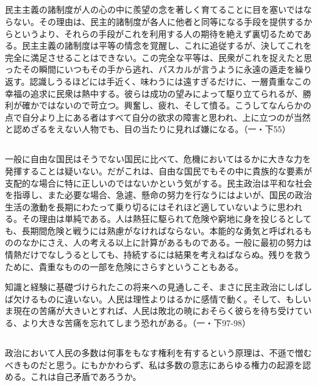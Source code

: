 \subsection{}



民主主義の諸制度が人の心の中に羨望の念を著しく育てることに目を塞いではならない。その理由は、民主的諸制度が各人に他者と同等になる手段を提供するからというより、それらの手段がこれを利用する人の期待を絶えず裏切るためである。民主主義の諸制度は平等の情念を覚醒し、これに追従するが、決してこれを完全に満足させることはできない。この完全な平等は、民衆がこれを捉えたと思ったその瞬間にいつもその手から逃れ、パスカルが言うように永遠の遁走を繰り返す。認識しうるほどには手近く、味わうには遠すぎるだけに、一層貴重なこの幸福の追求に民衆は熱中する。彼らは成功の望みによって駆り立てられるが、勝利が確かではないので苛立つ。興奮し、疲れ、そして憤る。こうしてなんらかの点で自分より上にある者はすべて自分の欲求の障害と思われ、上に立つのが当然と認めざるをえない人物でも、目の当たりに見れば嫌になる。（一・下55）


\subsection{}


一般に自由な国民はそうでない国民に比べて、危機においてはるかに大きな力を発揮することは疑いない。だがこれは、自由な国民でもその中に貴族的な要素が支配的な場合に特に正しいのではないかという気がする。民主政治は平和な社会を指導し、また必要な場合、急遽、懸命の努力を行なうにはよいが、国民の政治生活の激動を長期にわたって乗り切るにはそれほど適していないように思われる。その理由は単純である。人は熱狂に駆られて危険や窮地に身を投じるとしても、長期間危険と戦うには熟慮がなければならない。本能的な勇気と呼ばれるもののなかにさえ、人の考える以上に計算があるものである。一般に最初の努力は情熱だけでなしうるとしても、持続するには結果を考えねばならぬ。残りを救うために、貴重なものの一部を危険にさらすということもある。

知識と経験に基礎づけられたこの将来への見通しこそ、まさに民主政治にしばしば欠けるものに違いない。人民は理性よりはるかに感情で動く。そして、もしいま現在の苦痛が大きいとすれば、人民は敗北の暁におそらく彼らを待ち受けている、より大きな苦痛を忘れてしまう恐れがある。（一・下97-98）

\subsection{}


政治において人民の多数は何事をもなす権利を有するという原理は、不遜で憎むべきものだと思う。にもかかわらず、私は多数の意志にあらゆる権力の起源を認める。これは自己矛盾であろうか。

